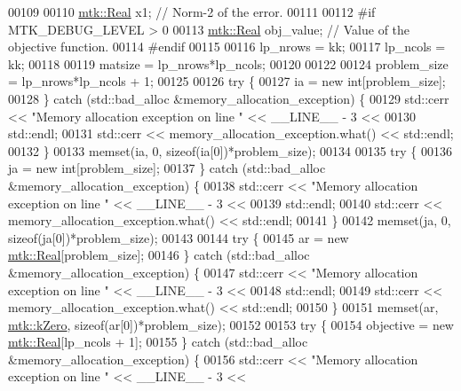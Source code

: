 \begin{DoxyCode}
00109 
00110   \hyperlink{group__c01-roots_gac080bbbf5cbb5502c9f00405f894857d}{mtk::Real} x1;             \textcolor{comment}{// Norm-2 of the error.}
00111 
00112 \textcolor{preprocessor}{  #if MTK\_DEBUG\_LEVEL > 0}
00113   \hyperlink{group__c01-roots_gac080bbbf5cbb5502c9f00405f894857d}{mtk::Real} obj\_value;      \textcolor{comment}{// Value of the objective function.}
00114 \textcolor{preprocessor}{  #endif}
00115 
00116   lp\_nrows = kk;
00117   lp\_ncols = kk;
00118 
00119   matsize = lp\_nrows*lp\_ncols;
00120 
00122 
00124   problem\_size = lp\_nrows*lp\_ncols + 1;
00125 
00126   \textcolor{keywordflow}{try} \{
00127     ia = \textcolor{keyword}{new} \textcolor{keywordtype}{int}[problem\_size];
00128   \} \textcolor{keywordflow}{catch} (std::bad\_alloc &memory\_allocation\_exception) \{
00129     std::cerr << \textcolor{stringliteral}{"Memory allocation exception on line "} << \_\_LINE\_\_ - 3 <<
00130       std::endl;
00131     std::cerr << memory\_allocation\_exception.what() << std::endl;
00132   \}
00133   memset(ia, 0, \textcolor{keyword}{sizeof}(ia[0])*problem\_size);
00134 
00135   \textcolor{keywordflow}{try} \{
00136     ja = \textcolor{keyword}{new} \textcolor{keywordtype}{int}[problem\_size];
00137   \} \textcolor{keywordflow}{catch} (std::bad\_alloc &memory\_allocation\_exception) \{
00138     std::cerr << \textcolor{stringliteral}{"Memory allocation exception on line "} << \_\_LINE\_\_ - 3 <<
00139       std::endl;
00140     std::cerr << memory\_allocation\_exception.what() << std::endl;
00141   \}
00142   memset(ja, 0, \textcolor{keyword}{sizeof}(ja[0])*problem\_size);
00143 
00144   \textcolor{keywordflow}{try} \{
00145     ar = \textcolor{keyword}{new} \hyperlink{group__c01-roots_gac080bbbf5cbb5502c9f00405f894857d}{mtk::Real}[problem\_size];
00146   \} \textcolor{keywordflow}{catch} (std::bad\_alloc &memory\_allocation\_exception) \{
00147     std::cerr << \textcolor{stringliteral}{"Memory allocation exception on line "} << \_\_LINE\_\_ - 3 <<
00148       std::endl;
00149     std::cerr << memory\_allocation\_exception.what() << std::endl;
00150   \}
00151   memset(ar, \hyperlink{group__c01-roots_ga59a451a5fae30d59649bcda274fea271}{mtk::kZero}, \textcolor{keyword}{sizeof}(ar[0])*problem\_size);
00152 
00153   \textcolor{keywordflow}{try} \{
00154     objective = \textcolor{keyword}{new} \hyperlink{group__c01-roots_gac080bbbf5cbb5502c9f00405f894857d}{mtk::Real}[lp\_ncols + 1];
00155   \} \textcolor{keywordflow}{catch} (std::bad\_alloc &memory\_allocation\_exception) \{
00156     std::cerr << \textcolor{stringliteral}{"Memory allocation exception on line "} << \_\_LINE\_\_ - 3 <<

\end{DoxyCode}
